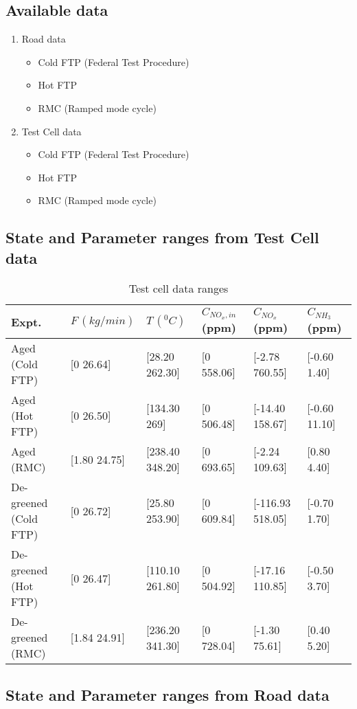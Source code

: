 \subsection{Available data}
\begin{enumerate}
    \item Road data
    \begin{itemize}
        \item Cold FTP (Federal Test Procedure)
        \item Hot FTP
        \item RMC (Ramped mode cycle)
    \end{itemize}
    \item Test Cell data
    \begin{itemize}
        \item Cold FTP (Federal Test Procedure)
        \item Hot FTP
        \item RMC (Ramped mode cycle)
    \end{itemize}

\end{enumerate}


\subsection{State and Parameter ranges from Test Cell data}

\begin{table}[H]
    \centering
    \begin{tabular}{l l l l l l}
        \hline \hline
Expt. & $F\,(kg/min)$ & $T\, (^0 C)$ & $C_{NO_x, in}$ (ppm) & $ C_{NO_x}$ (ppm) & $C_{NH_3}$ (ppm) \\\hline \hline
Aged (Cold FTP) & [0 26.64] & [28.20 262.30] & [0 558.06] & [-2.78
760.55] & [-0.60 1.40] \\
Aged (Hot FTP) & [0 26.50] & [134.30 269] & [0 506.48] & [-14.40
158.67] & [-0.60 11.10]\\
Aged (RMC) & [1.80 24.75] & [238.40 348.20] & [0 693.65] & [-2.24
109.63] & [0.80 4.40]\\
De-greened (Cold FTP) & [0 26.72] & [25.80 253.90] & [0 609.84] &
[-116.93 518.05] & [-0.70 1.70] \\
De-greened (Hot FTP) & [0 26.47] & [110.10 261.80] & [0 504.92] &
[-17.16 110.85] & [-0.50 3.70]\\
De-greened (RMC) & [1.84 24.91] & [236.20 341.30] & [0 728.04] &
[-1.30 75.61] & [0.40 5.20] \\
\hline \hline
    \end{tabular}
    \caption{Test cell data ranges}
\end{table}
\subsection{State and Parameter ranges from Road data}
